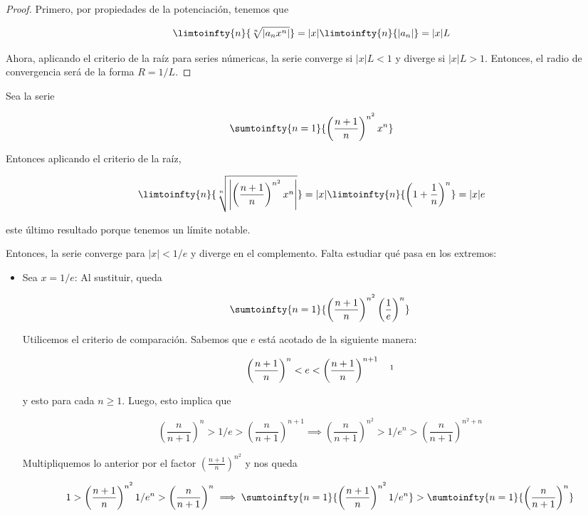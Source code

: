 \begin{proof}
    Primero, por propiedades de la potenciación, tenemos que
    
    \[
    \limtoinfty{n}{\sqrt[n]{|a_nx^n|}} = |x|\limtoinfty{n}{|a_n|} = |x|L
    \]
    
    Ahora, aplicando el criterio de la raíz para series númericas, la serie converge si $|x|L < 1$ y diverge si $|x|L>1$. Entonces, el radio de convergencia será de la forma $R=1/L$.
\end{proof}

\begin{ejem}
    Sea la serie
    
    \[
    \sumtoinfty{n=1}{\left(\frac{n+1}{n}\right)^{n^2}x^n}
    \]
    
    Entonces aplicando el criterio de la raíz,
    
    \[
    \limtoinfty{n}{\sqrt[n]{ \left| \left(\frac{n+1}{n}\right)^{n^2}x^n\right|}} = |x|\limtoinfty{n}{\left(1 + \frac{1}{n}\right)^n} = |x|e
    \]
    
    \noindent este último resultado porque tenemos un límite notable.
    
    Entonces, la serie converge para $|x| < 1/e$ y diverge en el complemento. Falta estudiar qué pasa en los extremos:
    
    \begin{itemize}
        \item Sea $x = 1/e$: Al sustituir, queda
        
        \[
        \sumtoinfty{n=1}{\left(\frac{n+1}{n}\right)^{n^2}\left(\frac{1}{e}\right)^n}
        \]
        
        Utilicemos el criterio de comparación. Sabemos que $e$ está acotado de la siguiente manera:
        
        \[
        \left(\frac{n+1}{n}\right)^n < e < \left(\frac{n+1}{n}\right)^{n+1} \quad \footnotemark
        \]
        
        \noindent y esto para cada $n\geq1$. Luego, esto implica que
        
        \[
        \left(\frac{n}{n+1}\right)^n > 1/e > \left(\frac{n}{n+1}\right)^{n+1} \implies \left(\frac{n}{n+1}\right)^{n^2} > 1/e^n > \left(\frac{n}{n+1}\right)^{n^2+n}
        \]
        
        Multipliquemos lo anterior por el factor $\left(\frac{n+1}{n}\right)^{n^2}$ y nos queda
        
        \[
        1 > \left(\frac{n+1}{n}\right)^{n^2} 1/e^n > \left(\frac{n}{n+1}\right)^n \implies \sumtoinfty{n=1}{\left(\frac{n+1}{n}\right)^{n^2} 1/e^n} > \sumtoinfty{n=1}{\left(\frac{n}{n+1}\right)^n}
        \]
        

\end{itemize}
\end{ejem}
